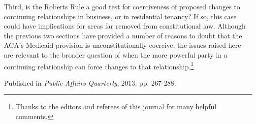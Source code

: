\documentclass[
  10pt,
  letterpaper,
  DIV=11,
  numbers=noendperiod,
  twoside]{scrartcl}
\begin{document}
Third, is the Roberts Rule a good test for coerciveness of proposed
changes to continuing relationships in business, or in residential
tenancy? If so, this case could have implications for areas far removed
from constitutional law. Although the previous two sections have
provided a number of reasons to doubt that the ACA's Medicaid provision
is unconstitutionally coercive, the issues raised here are relevant to
the broader question of when the more powerful party in a continuing
relationship can force changes to that relationship.\footnote{Thanks to
  the editors and referees of this journal for many helpful comments.}

\vspace{1cm}



\noindent Published in\emph{
Public Affairs Quarterly}, 2013, pp. 267-288.
\end{document}
